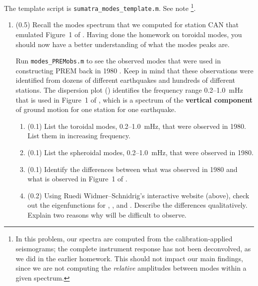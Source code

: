 \documentclass[11pt,titlepage,fleqn]{article}
\begin{document}
The template script is \verb+sumatra_modes_template.m+. See note \footnote{In this problem, our spectra are computed from the calibration-applied seismograms; the complete instrument response has not been deconvolved, as we did in the earlier homework. This should not impact our main findings, since we are not computing the {\em relative} amplitudes between modes within a given spectrum.}.

\begin{enumerate}
\item (0.5) Recall the modes spectrum that we computed for station CAN that emulated Figure~1 of \citet{Park2005}. Having done the homework on toroidal modes, you should now have a better understanding of what the modes peaks are.

Run \verb+modes_PREMobs.m+ to see the observed modes that were used in constructing PREM back in 1980 \citep{PREM}. Keep in mind that these observations were identified from dozens of different earthquakes and hundreds of different stations.
The dispersion plot () identifies the frequency range 0.2--1.0~mHz that is used in Figure~1 of \citet{Park2005}, which is a spectrum of the {\bf vertical component} of ground motion for one station for one earthquake.
%
\begin{enumerate}
\item (0.1) List the toroidal modes, 0.2--1.0~mHz, that were observed in 1980. \\
List them in increasing frequency.
\item (0.1) List the spheroidal modes, 0.2--1.0~mHz, that were observed in 1980.
\item (0.1) Identify the differences between what was observed in 1980 and what is observed in Figure~1 of \citet{Park2005}.
\item (0.2) Using Ruedi Widmer--Schnidrig's interactive website (above), check out the eigenfunctions for , , and . Describe the differences qualitatively. Explain two reasons why  will be difficult to observe.
\end{enumerate}


\end{enumerate}
\end{document}
